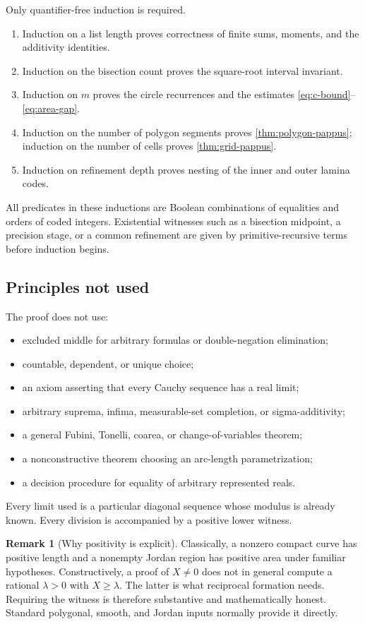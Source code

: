 \documentclass[11pt]{article}
\theoremstyle{definition}
\newtheorem{remark}[theorem]{Remark}
\begin{document}
Only quantifier-free induction is required.
\begin{enumerate}[leftmargin=2.2em]
\item Induction on a list length proves correctness of finite sums, moments,
and the additivity identities.
\item Induction on the bisection count proves the square-root interval
invariant.
\item Induction on $m$ proves the circle recurrences and the estimates
\eqref{eq:c-bound}--\eqref{eq:area-gap}.
\item Induction on the number of polygon segments proves
\cref{thm:polygon-pappus}; induction on the number of cells proves
\cref{thm:grid-pappus}.
\item Induction on refinement depth proves nesting of the inner and outer
lamina codes.
\end{enumerate}
All predicates in these inductions are Boolean combinations of equalities and
orders of coded integers.  Existential witnesses such as a bisection midpoint,
a precision stage, or a common refinement are given by primitive-recursive
terms before induction begins.

\subsection{Principles not used}

The proof does not use:
\begin{itemize}[leftmargin=2em]
\item excluded middle for arbitrary formulas or double-negation elimination;
\item countable, dependent, or unique choice;
\item an axiom asserting that every Cauchy sequence has a real limit;
\item arbitrary suprema, infima, measurable-set completion, or sigma-additivity;
\item a general Fubini, Tonelli, coarea, or change-of-variables theorem;
\item a nonconstructive theorem choosing an arc-length parametrization;
\item a decision procedure for equality of arbitrary represented reals.
\end{itemize}
Every limit used is a particular diagonal sequence whose modulus is already
known.  Every division is accompanied by a positive lower witness.

\begin{remark}[Why positivity is explicit]
Classically, a nonzero compact curve has positive length and a nonempty Jordan
region has positive area under familiar hypotheses.  Constructively, a proof
of $X\neq0$ does not in general compute a rational $\lambda>0$ with
$X\geq\lambda$.  The latter is what reciprocal formation needs.  Requiring the
witness is therefore substantive and mathematically honest.  Standard
polygonal, smooth, and Jordan inputs normally provide it directly.
\end{remark}
\end{document}
